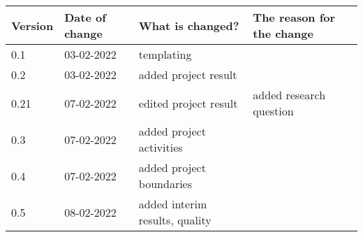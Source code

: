 \begin{tabular}{ | l | l | l | l |}
    \hline
    \textbf{Version} & \textbf{Date of change} & \textbf{What is changed?} & \textbf{The reason for the change} \\ \hline
    0.1 & 03-02-2022 & templating & \\
    0.2 & 03-02-2022 & added project result & \\
    0.21 & 07-02-2022 & edited project result & added research question\\
    0.3 & 07-02-2022 & added project activities &\\
    0.4 & 07-02-2022 & added project boundaries &\\
    0.5 & 08-02-2022 & added interim results, quality &\\
    \hline
\end{tabular}